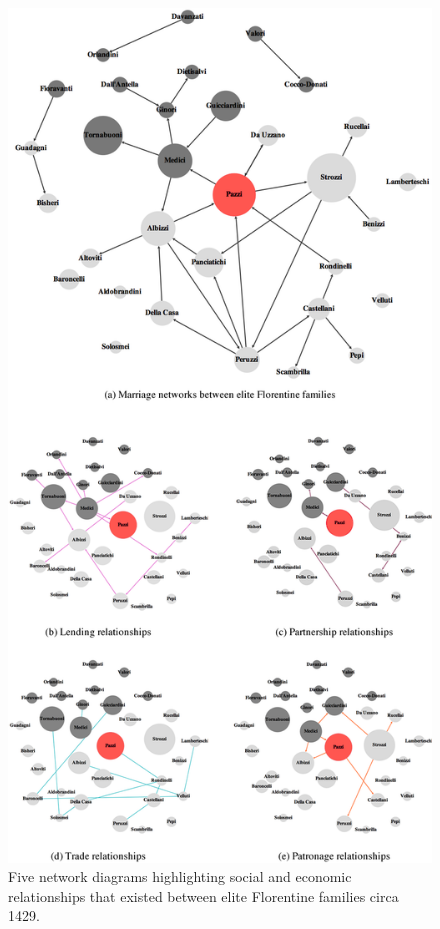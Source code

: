 \begin{figure}[h!]
\centering
\includegraphics[width=\textwidth,height=0.9\textheight,keepaspectratio]{imgs/allnetworks.png}
\caption[Social and economic relationships between elite Florentine families]{Five network diagrams highlighting social and economic relationships that existed between elite Florentine families circa 1429.}
\label{florentinenets}
\end{figure}

